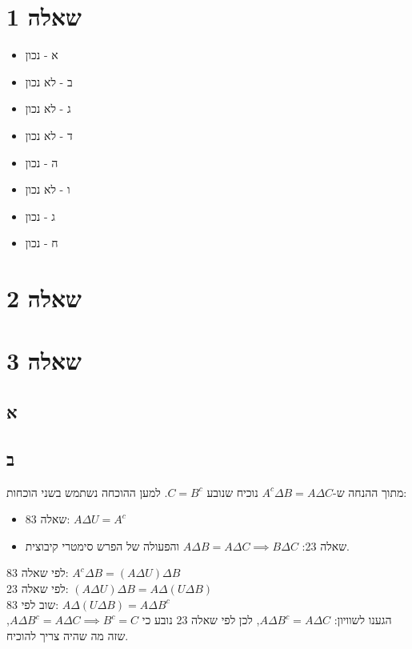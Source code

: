 \documentclass{article}
\title{}
\author{Eyal Shukrun}
\begin{document}
\maketitle

\section{שאלה 1}
\begin{itemize}
  \item א - נכון
  \item ב - לא נכון
  \item ג - לא נכון
  \item ד - לא נכון
  \item ה - נכון
  \item ו - לא נכון
  \item ג - נכון
  \item ח - נכון
\end{itemize}


\section{שאלה 2}
\section{שאלה 3}
\subsection{א}

\subsection{ב}
מתוך ההנחה ש-$A^{c} \Delta B = A \Delta  C $ נוכיח שנובע $C = B^{c} $.
למען ההוכחה נשתמש בשני הוכחות:
\begin{itemize}
  \item שאלה 83: $A \Delta U = A^{c} $
  \item שאלה 23: $A \Delta B = A \Delta C \implies B \Delta C$ והפעולה של הפרש סימטרי קיבוצית.
\end{itemize}

לפי שאלה 83: $A^{c} \Delta  B = (A \Delta  U) \Delta B$\\
לפי שאלה 23: $(A \Delta U) \Delta B = A \Delta (U \Delta B)$\\
שוב לפי 83: $A \Delta (U \Delta B) = A \Delta B^{c}$\\
הגענו לשוויון: $A \Delta B^{c} = A \Delta C$, לכן לפי שאלה 23 נובע כי $A \Delta B^{c} = A \Delta C \implies  B^{c}  = C$, שזה מה שהיה צריך להוכיח. 
\end{document}
